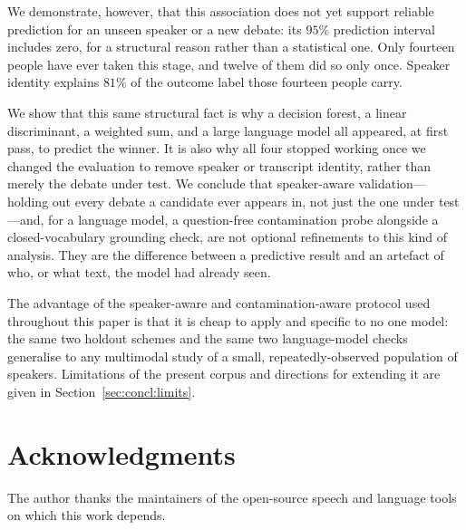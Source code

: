 \documentclass[pdflatex,sn-mathphys-num]{sn-jnl}%
\begin{document}
We demonstrate, however, that this association does not yet support
reliable prediction for an unseen speaker or a new debate: its $95\%$
prediction interval includes zero, for a structural reason rather than a
statistical one. Only fourteen people have ever taken this stage, and twelve of
them did so only once. Speaker identity explains $81\%$ of the outcome label those
fourteen people carry.

We show that this same structural fact is why a decision forest, a linear
discriminant, a weighted sum, and a large language model all appeared, at
first pass, to predict the winner. It is also why all four stopped working
once we changed the evaluation to remove speaker or transcript identity,
rather than merely the debate under test. We conclude that speaker-aware
validation---holding out every debate a candidate ever appears in, not just
the one under test---and, for a language model, a question-free
contamination probe alongside a closed-vocabulary grounding check, are not
optional refinements to this kind of analysis. They are the difference
between a predictive result and an artefact of who, or what text, the model
had already seen.

The advantage of the speaker-aware and contamination-aware protocol used
throughout this paper is that it is cheap to apply and specific to no one
model: the same two holdout schemes and the same two language-model checks
generalise to any multimodal study of a small, repeatedly-observed
population of speakers. Limitations of the present corpus and directions
for extending it are given in Section~\ref{sec:concl:limits}.

\section*{Acknowledgments}
The author thanks the maintainers of the open-source speech and language tools
on which this work depends.
\end{document}

